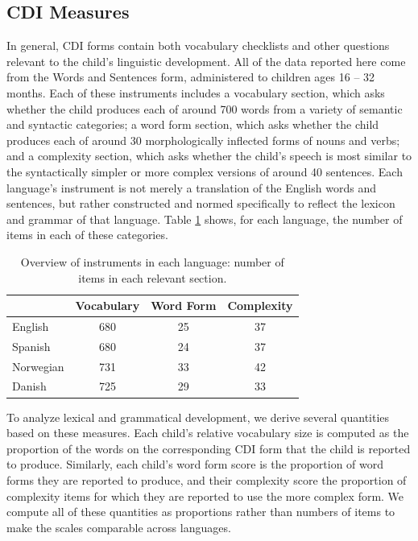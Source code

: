 \documentclass[10pt,letterpaper]{article}
\begin{document}
\subsection{CDI Measures}

In general, CDI forms contain both vocabulary checklists and other questions relevant to the child's linguistic development. All of the data reported here come from the Words and Sentences form, administered to children ages 16 -- 32 months. Each of these instruments includes a vocabulary section, which asks whether the child produces each of around 700 words from a variety of semantic and syntactic categories; a word form section, which asks whether the child produces each of around 30 morphologically inflected forms of nouns and verbs; and a complexity section, which asks whether the child's speech is most similar to the syntactically simpler or more complex versions of around 40 sentences. Each language's instrument is not merely a translation of the English words and sentences, but rather constructed and normed specifically to reflect the lexicon and grammar of that language. Table \ref{table:measures} shows, for each language, the number of items in each of these categories.

\begin{table}[t]
\begin{center}
\begin{tabular}{lccc}
\hline
& Vocabulary & Word Form & Complexity\\ 
\hline
English & 680 & 25 & 37\\ 
Spanish & 680 & 24 & 37\\ 
Norwegian & 731 & 33 & 42\\ 
Danish & 725 & 29 & 33\\ 
\hline
\end{tabular}
\caption{\label{table:measures} Overview of instruments in each language: number of items in each relevant section.}
\end{center}
\end{table}

To analyze lexical and grammatical development, we derive several quantities based on these measures. Each child's relative vocabulary size is computed as the proportion of the words on the corresponding CDI form that the child is reported to produce. Similarly, each child's word form score is the proportion of word forms they are reported to produce, and their complexity score the proportion of complexity items for which they are reported to use the more complex form. We compute all of these quantities as proportions rather than numbers of items to make the scales comparable across languages.
\end{document}
